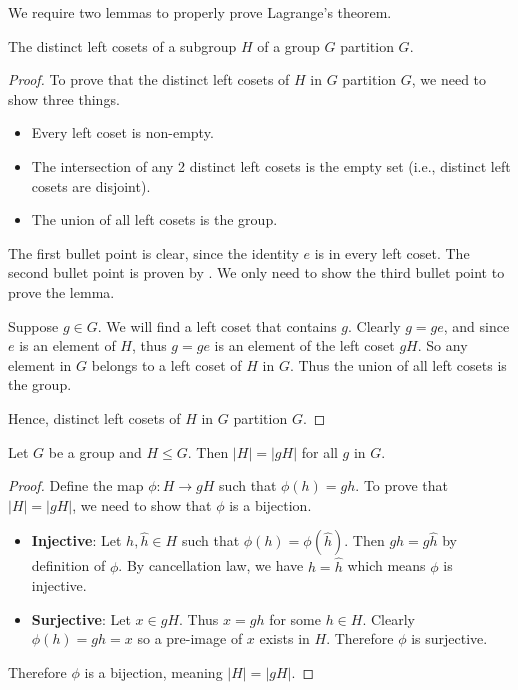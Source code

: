 We require two lemmas to properly prove Lagrange's theorem.
\begin{lemma}\label{lemma-left-coset-partition}
    The distinct left cosets of a subgroup $H$ of a group $G$ partition $G$.
\end{lemma}
\begin{proof}
    To prove that the distinct left cosets of $H$ in $G$ partition $G$, we need to show three things.
    \begin{itemize}
        \item Every left coset is non-empty.
        \item The intersection of any 2 distinct left cosets is the empty set (i.e., distinct left cosets are disjoint).
        \item The union of all left cosets is the group.
    \end{itemize}
    The first bullet point is clear, since the identity $e$ is in every left coset. The second bullet point is proven by . We only need to show the third bullet point to prove the lemma.

    Suppose $g \in G$. We will find a left coset that contains $g$. Clearly $g = ge$, and since $e$ is an element of $H$, thus $g = ge$ is an element of the left coset $gH$. So any element in $G$ belongs to a left coset of $H$ in $G$. Thus the union of all left cosets is the group.

    Hence, distinct left cosets of $H$ in $G$ partition $G$.
\end{proof}

\begin{lemma}\label{lemma-order-of-coset}
    Let $G$ be a group and $H \leq G$. Then $|H| = |gH|$ for all $g$ in $G$.
\end{lemma}
\begin{proof}
    Define the map $\phi: H \to gH$ such that $\phi(h) = gh$. To prove that $|H| = |gH|$, we need to show that $\phi$ is a bijection.
    \begin{itemize}
        \item \textbf{Injective}: Let $h, \hat{h} \in H$ such that $\phi(h) = \phi(\hat{h})$. Then $gh = g\hat{h}$ by definition of $\phi$. By cancellation law, we have $h = \hat{h}$ which means $\phi$ is injective.
        \item \textbf{Surjective}: Let $x \in gH$. Thus $x = gh$ for some $h \in H$. Clearly $\phi(h) = gh = x$ so a pre-image of $x$ exists in $H$. Therefore $\phi$ is surjective.
    \end{itemize}
    Therefore $\phi$ is a bijection, meaning $|H| = |gH|$.
\end{proof}

